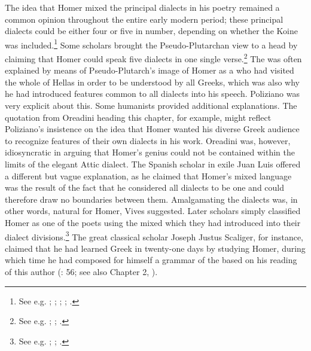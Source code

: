 The idea that Homer mixed the principal dialects in his poetry remained a common opinion throughout the entire early modern period; these principal dialects could be either four or five in number, depending on whether the Koine was included.\footnote{See e.g. \citet[\textsc{aa.}i\textsc{\textsuperscript{r}}]{Simler1512}; \citet[\textsc{a}.viii\textsc{\textsuperscript{r}}]{Liburnio1546}; \citet[\textsc{xxxiv}]{Lancelot1655}; \citet[20--23]{Grosch1753}; \citet[196]{Ries1786}.} Some scholars brought the Pseudo-Plutarchan view to a head by claiming that Homer could speak five dialects in one single verse.\footnote{See e.g. \citet[\textit{s.v.} “dialecte”]{Furetiere1701}; \citet[\textsc{i.}203, 3rd sequence of pagination]{Chambers1728}; \citet[934]{Dumarsais1754}.} The  was often explained by means of Pseudo-Plutarch’s image of Homer as a  who had visited the whole of Hellas in order to be understood by all Greeks, which was also why he had introduced features common to all dialects into his speech. Poliziano was very explicit about this. Some humanists provided additional explanations. The quotation from Oreadini heading this chapter, for example, might reflect Poliziano’s insistence on the idea that Homer wanted his diverse Greek audience to recognize features of their own dialects in his work. Oreadini was, however, idiosyncratic in arguing that Homer’s genius could not be contained within the limits of the elegant Attic dialect. The Spanish scholar in exile Juan Luis \citet[\textsc{x}.iiii\textsc{\textsuperscript{r}}]{Vives1533} offered a different but vague explanation, as he claimed that Homer’s mixed language was the result of the fact that he considered all dialects to be one and could therefore draw no boundaries between them. Amalgamating the dialects was, in other words, natural for Homer, Vives suggested. Later scholars simply classified Homer as one of the poets using the mixed  which they had introduced into their dialect divisions.\footnote{See e.g. \citet[6\textsc{\textsuperscript{r}}-6\textsc{\textsuperscript{v}}]{Baile1588}; \citet[333]{Alsted1630}; \citet[161]{Gesner1774}.} The great classical scholar Joseph Justus Scaliger, for instance, claimed that he had learned Greek in twenty-one days by studying Homer, during which time he had composed for himself a grammar of the  based on his reading of this author (\citealt{Scaliger1594}: 56; see also Chapter 2, ).

